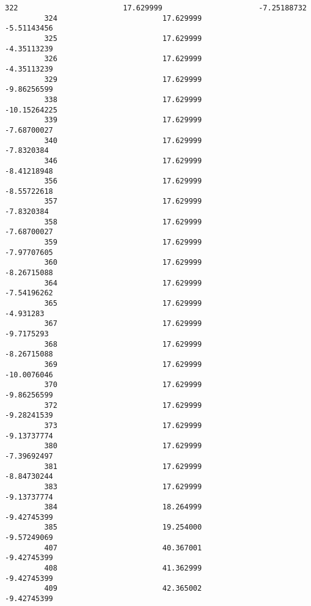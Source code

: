 \documentclass[11pt]{article}
\begin{document}
\begin{Verbatim}[commandchars=\\\{\}]
         322                        17.629999                      -7.25188732   
         324                        17.629999                      -5.51143456   
         325                        17.629999                      -4.35113239   
         326                        17.629999                      -4.35113239   
         329                        17.629999                      -9.86256599   
         338                        17.629999                     -10.15264225   
         339                        17.629999                      -7.68700027   
         340                        17.629999                       -7.8320384   
         346                        17.629999                      -8.41218948   
         356                        17.629999                      -8.55722618   
         357                        17.629999                       -7.8320384   
         358                        17.629999                      -7.68700027   
         359                        17.629999                      -7.97707605   
         360                        17.629999                      -8.26715088   
         364                        17.629999                      -7.54196262   
         365                        17.629999                        -4.931283   
         367                        17.629999                       -9.7175293   
         368                        17.629999                      -8.26715088   
         369                        17.629999                      -10.0076046   
         370                        17.629999                      -9.86256599   
         372                        17.629999                      -9.28241539   
         373                        17.629999                      -9.13737774   
         380                        17.629999                      -7.39692497   
         381                        17.629999                      -8.84730244   
         383                        17.629999                      -9.13737774   
         384                        18.264999                      -9.42745399   
         385                        19.254000                      -9.57249069   
         407                        40.367001                      -9.42745399   
         408                        41.362999                      -9.42745399   
         409                        42.365002                      -9.42745399   
         

\end{Verbatim}
\end{document}

